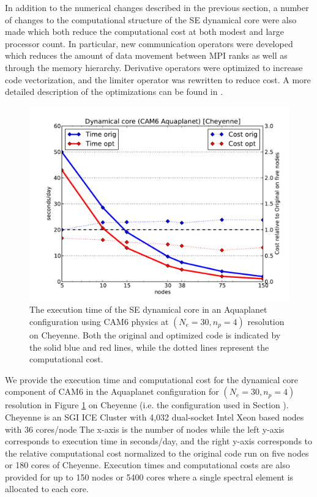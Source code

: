 In addition to the numerical changes described in the previous section, a number of changes to the computational structure of the SE dynamical core were also made which both reduce the computational cost at both modest and large processor count.  In particular, new communication operators were developed which reduces the amount of data movement between MPI ranks as well as through the memory hierarchy. Derivative operators were optimized to increase code vectorization, and the limiter operator was rewritten to reduce cost.  A more detailed description of the optimizations can be found in \cite{dennis2017}.  

\begin{figure}[h]
\centering
 \includegraphics[scale=0.45]{figs/aqua-perf}
 \caption{The execution time of the SE dynamical core in an Aquaplanet configuration using CAM6 physics at $(N_e=30, n_p=4)$ resolution on Cheyenne.   Both the original and optimized code is indicated by the solid blue and red lines, while the dotted lines represent the computational cost.}
 \label{fig:aqua-perf}
\end{figure}

We provide the execution time and computational cost for the dynamical core component of CAM6 in the Aquaplanet configuration for $(N_e=30, n_p=4)$ resolution in Figure \ref{fig:aqua-perf} on Cheyenne (i.e. the configuration used in Section \label{sec:APE}). Cheyenne is an SGI ICE Cluster with 4,032 dual-socket Intel Xeon based nodes with 36 cores/node   The x-axis is the number of nodes while the left y-axis corresponds to execution time in seconds/day, and the right y-axis corresponds to the relative computational cost normalized to the original code run on five nodes or 180 cores of Cheyenne. Execution times and computational costs are also provided for up to 150 nodes or 5400 cores where a single spectral element is allocated to each core.

